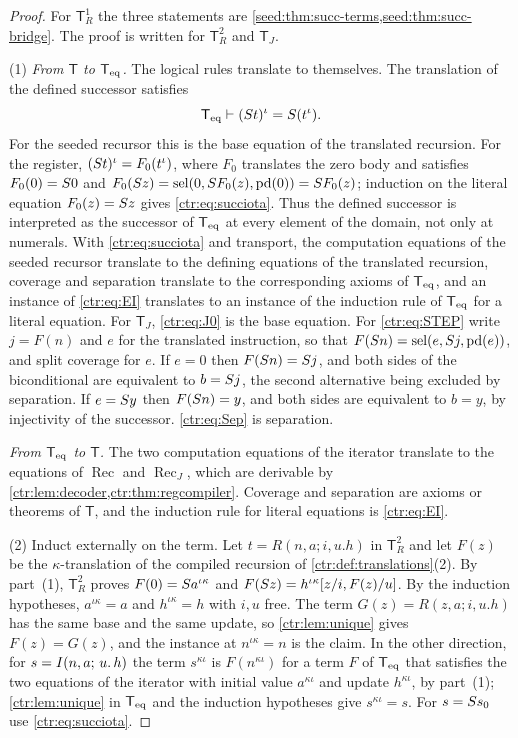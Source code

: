 \begin{proof}
For $\mathsf T_R^1$ the three statements are \cref{seed:thm:succ-terms,seed:thm:succ-bridge}.
The proof is written for $\mathsf T_R^2$ and $\mathsf T_J$.

(1) \emph{From $\mathsf T$ to $\mathsf{T}_{\mathrm{eq}}$.} The logical rules translate to themselves. The
translation of the defined successor satisfies
\begin{equation}\label{ctr:eq:succiota}
 \mathsf{T}_{\mathrm{eq}}\vdash(S t)^\iota=S(t^\iota).
\end{equation}
For the seeded recursor this is the base equation of the translated recursion. For the
register, $(S t)^\iota=F_0(t^\iota)$, where $F_0$ translates the zero body and satisfies
$F_0(0)=S 0$ and $F_0(S z)=\operatorname{sel}(0,S F_0(z),\mathrm{pd}(0))=S F_0(z)$; induction on
the literal equation $F_0(z)=S z$ gives \eqref{ctr:eq:succiota}. Thus the defined
successor is interpreted as the successor of $\mathsf{T}_{\mathrm{eq}}$ at every element of the domain, not only
at numerals. With \eqref{ctr:eq:succiota} and transport, the computation equations of the
seeded recursor translate to the defining equations of the translated recursion, coverage
and separation translate to the corresponding axioms of $\mathsf{T}_{\mathrm{eq}}$, and an instance of
\eqref{ctr:eq:EI} translates to an instance of the induction rule of $\mathsf{T}_{\mathrm{eq}}$ for a literal
equation. For $\mathsf T_J$, \eqref{ctr:eq:J0} is the base equation. For
\eqref{ctr:eq:STEP} write $j=F(n)$ and $e$ for the translated instruction, so that
$F(S n)=\operatorname{sel}(e,S j,\mathrm{pd}(e))$, and split coverage for $e$. If $e=0$ then
$F(S n)=S j$, and both sides of the biconditional are equivalent to $b=S j$, the
second alternative being excluded by separation. If $e=S y$ then $F(S n)=y$, and both
sides are equivalent to $b=y$, by injectivity of the successor. \eqref{ctr:eq:Sep} is
separation.

\emph{From $\mathsf{T}_{\mathrm{eq}}$ to $\mathsf T$.} The two computation equations of the iterator translate
to the equations of $\operatorname{Rec}$ and $\operatorname{Rec}_J$, which are
derivable by \cref{ctr:lem:decoder,ctr:thm:regcompiler}. Coverage and separation are axioms
or theorems of $\mathsf T$, and the induction rule for literal equations is
\eqref{ctr:eq:EI}.

(2) Induct externally on the term. Let $t=R(n,a;i,u.h)$ in $\mathsf T_R^2$ and let
$F(z)$ be the $\kappa$-translation of the compiled recursion of
\cref{ctr:def:translations}(2). By part~(1), $\mathsf T_R^2$ proves
$F(0)=S a^{\iota\kappa}$ and $F(S z)=h^{\iota\kappa}[z/i,F(z)/u]$. By the induction
hypotheses, $a^{\iota\kappa}=a$ and $h^{\iota\kappa}=h$ with $i,u$ free. The term
$G(z)=R(z,a;i,u.h)$ has the same base and the same update, so \cref{ctr:lem:unique} gives
$F(z)=G(z)$, and the instance at $n^{\iota\kappa}=n$ is the claim.
In the other direction, for $s=I(n,a;\,u.\,h)$ the term $s^{\kappa\iota}$ is $F(n^{\kappa\iota})$
for a term $F$ of $\mathsf{T}_{\mathrm{eq}}$ that satisfies the two equations of the iterator with initial value
$a^{\kappa\iota}$ and update $h^{\kappa\iota}$, by part~(1); \cref{ctr:lem:unique} in $\mathsf{T}_{\mathrm{eq}}$
and the induction hypotheses give $s^{\kappa\iota}=s$. For $s=S s_0$ use
\eqref{ctr:eq:succiota}.


\end{proof}
